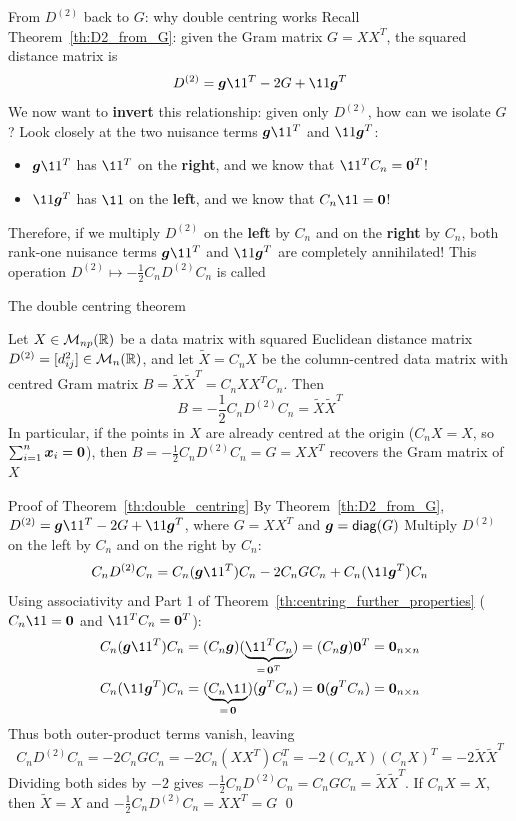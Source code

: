 \documentclass[aspectratio=169]{beamer}\usepackage[]{graphicx}\usepackage[]{xcolor}
\begin{document}
\begin{frame}{From $D^{(2)}$ back to $G$: why double centring works}
Recall Theorem~\ref{th:D2_from_G}: given the Gram matrix $G = XX^T$, the squared distance matrix is
\[
D^{(2)} = \bg\11^T - 2G + \11\bg^T
\]
We now want to \textbf{invert} this relationship: given only $D^{(2)}$, how can we isolate $G$?
\vfill
Look closely at the two nuisance terms $\bg\11^T$ and $\11\bg^T$:
\begin{itemize}
\item $\bg\11^T$ has $\11^T$ on the \textbf{right}, and we know that $\11^T C_n = \b0^T$!
\vfill
\item $\11\bg^T$ has $\11$ on the \textbf{left}, and we know that $C_n\11 = \b0$!
\end{itemize}
\vfill
Therefore, if we multiply $D^{(2)}$ on the \textbf{left} by $C_n$ and on the \textbf{right} by $C_n$, both rank-one nuisance terms $\bg\11^T$ and $\11\bg^T$ are completely annihilated!
\vfill
This operation $D^{(2)} \mapsto -\frac{1}{2}C_n D^{(2)} C_n$ is called 
\end{frame}

\begin{frame}{The double centring theorem}
\begin{theorem}
\label{th:double_centring}
Let $X\in\mathcal{M}_{np}(\mathbb{R})$ be a data matrix with squared Euclidean distance matrix $D^{(2)} = [d_{ij}^2]\in\mathcal{M}_n(\mathbb{R})$, and let $\widetilde{X} = C_n X$ be the column-centred data matrix with centred Gram matrix $B = \widetilde{X}\widetilde{X}^T = C_n X X^T C_n$. Then
\[
B = -\frac{1}{2} C_n D^{(2)} C_n = \widetilde{X}\widetilde{X}^T
\]
In particular, if the points in $X$ are already centred at the origin ($C_n X = X$, so $\sum_{i=1}^n \bx_i = \b0$), then $B = -\frac{1}{2} C_n D^{(2)} C_n = G = XX^T$ recovers the Gram matrix of $X$
\end{theorem}
\end{frame}

\begin{frame}{Proof of Theorem~\ref{th:double_centring}}
By Theorem~\ref{th:D2_from_G}, $D^{(2)} = \bg\11^T - 2G + \11\bg^T$, where $G = XX^T$ and $\bm{g} = \mathsf{diag}(G)$
\vfill
Multiply $D^{(2)}$ on the left by $C_n$ and on the right by $C_n$:
\[
C_n D^{(2)} C_n = C_n(\bg\11^T)C_n - 2 C_n G C_n + C_n(\11\bg^T)C_n
\]
\vfill
Using associativity and Part 1 of Theorem~\ref{th:centring_further_properties} ($C_n\11 = \b0$ and $\11^T C_n = \b0^T$):
\begin{align*}
C_n(\bg\11^T)C_n &= (C_n\bg)(\underbrace{\11^T C_n}_{=\,\b0^T}) = (C_n\bg)\b0^T = \b0_{n\times n} \\
C_n(\11\bg^T)C_n &= (\underbrace{C_n\11}_{=\,\b0})(\bg^T C_n) = \b0(\bg^T C_n) = \b0_{n\times n}
\end{align*}
\vfill
Thus both outer-product terms vanish, leaving
\[
C_n D^{(2)} C_n = -2 C_n G C_n = -2 C_n (XX^T) C_n^T = -2(C_n X)(C_n X)^T = -2\widetilde{X}\widetilde{X}^T
\]
Dividing both sides by $-2$ gives $-\frac{1}{2}C_n D^{(2)} C_n = C_n G C_n = \widetilde{X}\widetilde{X}^T$. If $C_n X = X$, then $\widetilde{X} = X$ and $-\frac{1}{2}C_n D^{(2)} C_n = XX^T = G$ \hfill\qed
\end{frame}
\end{document}
